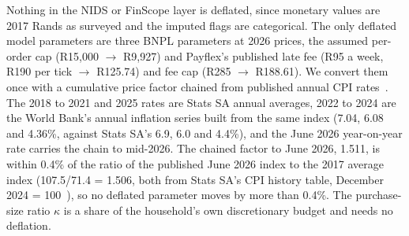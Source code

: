 Nothing in the \ac{NIDS} or \ac{FinScope} layer is deflated, since monetary values are 2017 Rands
as surveyed and the imputed flags are categorical. The only deflated model parameters are three
\ac{BNPL} parameters at 2026 prices, the assumed per-order cap (R15{,}000
$\to$ R9{,}927) and Payflex's published late fee (R95 a week, R190 per tick $\to$ R125.74) and fee cap
(R285 $\to$ R188.61). We convert them once with a cumulative price factor chained from published
annual \ac{CPI} rates~\citep{statssa_cpi}. The 2018 to 2021 and 2025 rates are Stats SA annual averages, 2022 to
2024 are the World Bank's annual inflation series built from the same index (7.04, 6.08 and 4.36\%, against Stats
SA's 6.9, 6.0 and 4.4\%), and the June 2026 year-on-year rate carries the chain to mid-2026. The chained factor to June 2026, 1.511, is within 0.4\% of the ratio of the
published June 2026 index to the 2017 average index (107.5/71.4 = 1.506, both from Stats SA's
\ac{CPI} history table, December 2024 = 100~\citep{statssa_cpi_history}), so no deflated
parameter moves by more than 0.4\%. The
purchase-size ratio $\kappa$ is a share of the household's own discretionary budget and needs no
deflation.
